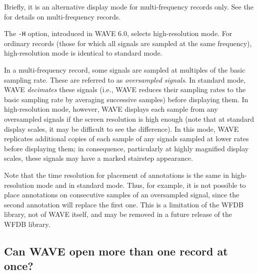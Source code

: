 \documentclass[twoside]{book}
\newcommand{\WAVE}{{\sf WAVE}\xspace}
\begin{document}
\label{faq:high-res}
Briefly, it is an alternative display mode for multi-frequency records
only.  See the
for details on multi-frequency records.

\index{H option for WAVE@{\tt -H} option for \WAVE{}}
The {\tt -H} option, introduced in \WAVE{} 6.0, selects
high-resolution mode.  For ordinary records (those for which all
signals are sampled at the same frequency), high-resolution mode is
identical to standard mode.

In a multi-frequency record, some signals are sampled at multiples of
the basic sampling rate.  These are referred to as \emph{oversampled
signals}.  In standard mode, \WAVE{} \emph{decimates} these signals
(i.e., \WAVE{} reduces their sampling rates to the basic sampling rate
by averaging successive samples) before displaying them.  In
high-resolution mode, however, \WAVE{} displays each sample from any
oversampled signals if the screen resolution is high enough (note that
at standard display scales, it may be difficult to see the
difference).  In this mode, \WAVE{} replicates additional copies of
each sample of any signals sampled at lower rates before displaying
them; in consequence, particularly at highly magnified display scales,
these signals may have a marked stairstep appearance.

Note that the time resolution for placement of annotations is the same
in high-resolution mode and in standard mode.  Thus, for example, it
is not possible to place annotations on consecutive samples of an
oversampled signal, since the second annotation will replace the first
one.  This is a limitation of the WFDB library, not of \WAVE{} itself,
and may be removed in a future release of the WFDB library.

\subsection{Can \WAVE{} open more than one record at once?}
\end{document}
